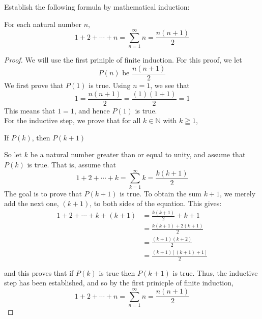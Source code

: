 \begin{example}
Establish the following formula by mathematical induction:
    
    \begin{tcolorbox}
        \begin{theorem}
            For each natural number $n$,
                \begin{equation*}
                    1 + 2 + \cdots + n = \sum_{n=1}^{\infty} n = \frac{n(n+1)}{2}
                \end{equation*}
        \end{theorem}
    \end{tcolorbox}

    \begin{proof}
        We will use the first priniple of finite induction. For this proof, we let
            \begin{equation*}
                P(n) \text{ be } \frac{n(n+1)}{2}
            \end{equation*}
        We first prove that $P(1)$ is true. Using $n=1$, we see that
            \begin{equation*}
                1 = \frac{n(n+1)}{2} = \frac{(1)(1+1)}{2} = 1
            \end{equation*}
        This means that $1=1$, and hence $P(1)$ is true. \\
        For the inductive step, we prove that for all $k \in \mathbb{N}$ with $k \geqq 1$, 
            \begin{center}
                If $P(k)$, then $P(k+1)$
            \end{center}
        So let $k$ be a natural number greater than or equal to unity, and assume that $P(k)$ is true. That is, assume that 
            \begin{equation*}
               1 + 2 + \cdots + k = \sum_{k=1}^{\infty} k = \frac{k(k+1)}{2}
            \end{equation*}
        The goal is to prove that $P(k+1)$ is true. To obtain the sum $k+1$, we merely add the next one, $(k+1)$, to both sides of the equation. This gives: 
            \begin{align*}
                1 + 2 + \cdots + k + (k+1) & = \frac{k(k+1)}{2} + k+1\\
                    & = \frac{k(k+1) + 2(k+1)}{2} \\
                    & = \frac{(k+1)(k+2)}{2} \\
                    & = \frac{(k+1)[(k+1)+1]}{2} \\  \\   
            \end{align*}
        and this proves that if $P(k)$ is true then $P(k+1)$ is true. Thus, the inductive step has been established, and so by the first prinicple of finite induction,
            \begin{equation*}
                1 + 2 + \cdots + n = \sum_{n=1}^{\infty} n = \frac{n(n+1)}{2}
            \end{equation*}
    \end{proof}
\end{example}



